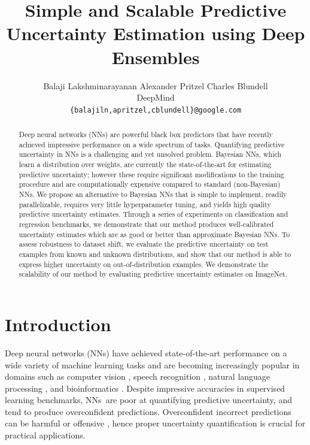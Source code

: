 \documentclass{article}
\title{
Simple and Scalable Predictive Uncertainty Estimation using Deep Ensembles
}
\author{
Balaji Lakshminarayanan \quad Alexander Pritzel \quad Charles Blundell\\
     DeepMind\\
    \texttt{\{balajiln,apritzel,cblundell\}@google.com}
    \date{}
}
\newcommand{\nn}{NNs}
\begin{document}
\maketitle %


\begin{abstract}
 Deep neural networks (NNs) are powerful black box predictors that have recently achieved impressive performance on a wide spectrum of tasks. Quantifying predictive uncertainty in NNs is a challenging and yet unsolved problem.  Bayesian NNs, which learn a distribution over weights, are currently the state-of-the-art for estimating predictive uncertainty; however these require significant modifications to the training procedure and are computationally expensive compared to standard (non-Bayesian)  NNs.  We propose an alternative to Bayesian NNs that is simple to implement, readily parallelizable, requires very little hyperparameter tuning, and yields high quality predictive uncertainty estimates. Through a series of experiments on classification and regression benchmarks, we demonstrate that our method produces well-calibrated uncertainty estimates which are as good or better than approximate Bayesian NNs. To assess robustness to dataset shift, we evaluate the predictive uncertainty on test examples from known and unknown distributions, and show that our method is able to express higher uncertainty on out-of-distribution examples. We demonstrate the scalability of our method by evaluating predictive uncertainty estimates on ImageNet. 
\end{abstract}


\section{Introduction}
Deep neural networks (NNs) %
have achieved state-of-the-art performance on a wide variety of machine learning tasks \citep{lecun2015deep}  and are becoming increasingly popular in domains such as computer vision \citep{krizhevsky2012imagenet}, speech recognition \citep{hinton2012deep}, natural language processing \citep{mikolov2013efficient}, and bioinformatics \citep{alipanahi2015predicting,zhou2015predicting}.
Despite impressive accuracies in supervised learning benchmarks, %
\nn~are poor at quantifying predictive uncertainty, and tend to produce overconfident predictions. Overconfident incorrect predictions can be harmful or offensive \citep{amodei2016concrete}, hence proper uncertainty quantification is crucial for practical applications. %
\end{document}
